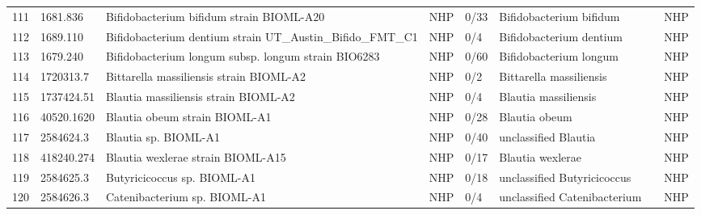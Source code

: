 \begin{longtable}{llllllll}
111 &      1681.836 &                                 Bifidobacterium bifidum strain BIOML-A20 &   NHP &      0/33 &                        Bifidobacterium bifidum &            \cite{poyet2019library,turroni2014bifidobacterium} &   NHP \\
112 &      1689.110 &               Bifidobacterium dentium strain UT\_Austin\_Bifido\_FMT\_C1 &   NHP &       0/4 &                        Bifidobacterium dentium &                                       \cite{simpson2020draft} &   NHP \\
113 &      1679.240 &                      Bifidobacterium longum subsp. longum strain BIO6283 &   NHP &      0/60 &                         Bifidobacterium longum &                                     \cite{wong2019beneficial} &   NHP \\
114 &     1720313.7 &                                  Bittarella massiliensis strain BIOML-A2 &   NHP &       0/2 &                        Bittarella massiliensis &                  \cite{poyet2019library,durand2017bittarella} &   NHP \\
115 &    1737424.51 &                                     Blautia massiliensis strain BIOML-A2 &   NHP &       0/4 &                           Blautia massiliensis &                     \cite{poyet2019library,durand2017blautia} &   NHP \\
116 &    40520.1620 &                                            Blautia obeum strain BIOML-A1 &   NHP &      0/28 &                                  Blautia obeum &              \cite{poyet2019library,hatziioanou2017discovery} &   NHP \\
117 &     2584624.3 &                                                     Blautia sp. BIOML-A1 &   NHP &      0/40 &                           unclassified Blautia &                             \cite{poyet2019library,2584624.3} &   NHP \\
118 &    418240.274 &                                        Blautia wexlerae strain BIOML-A15 &   NHP &      0/17 &                               Blautia wexlerae &               \cite{poyet2019library,liu2008reclassification} &   NHP \\
119 &     2584625.3 &                                              Butyricicoccus sp. BIOML-A1 &   NHP &      0/18 &                    unclassified Butyricicoccus &                             \cite{poyet2019library,2584625.3} &   NHP \\
120 &     2584626.3 &                                             Catenibacterium sp. BIOML-A1 &   NHP &       0/4 &                   unclassified Catenibacterium &                             \cite{poyet2019library,2584626.3} &   NHP \\

\end{longtable}
